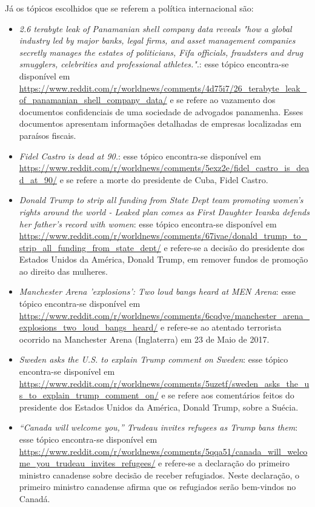 Já os tópicos escolhidos que se referem a política internacional são:
\begin{itemize}
  \item
  \textit{2.6 terabyte leak of Panamanian shell company data reveals "how a
  global industry led by major banks, legal firms, and asset management companies
  secretly manages the estates of politicians, Fifa officials, fraudsters and
  drug smugglers, celebrities and professional
  athletes."}.: esse tópico encontra-se disponível em
  \url{https://www.reddit.com/r/worldnews/comments/4d75i7/26_terabyte_leak_of_panamanian_shell_company_data/}
  e se refere ao vazamento dos documentos confidenciais de uma
  sociedade de advogados panamenha. Esses documentos apresentam informações
  detalhadas de empresas localizadas em paraísos fiscais.
  \item
  \textit{Fidel Castro is dead at
  90.}: esse tópico encontra-se disponível em
  \url{https://www.reddit.com/r/worldnews/comments/5exz2e/fidel_castro_is_dead_at_90/}
  e se refere a morte do presidente de Cuba, Fidel Castro.
  
  \item
  \textit{Donald Trump to strip all funding from State Dept team promoting
  women's rights around the world - Leaked plan comes as First Daughter Ivanka
  defends her father's record with women}: esse tópico encontra-se disponível em
  \url{https://www.reddit.com/r/worldnews/comments/67ivae/donald_trump_to_strip_all_funding_from_state_dept/}
  e refere-se a decisão do presidente dos Estados Unidos da América, Donald
  Trump, em remover fundos de promoção ao direito das mulheres.
  
  \item
  \textit{Manchester Arena 'explosions': Two loud bangs heard at MEN Arena}:
  esse tópico encontra-se disponível em
  \url{https://www.reddit.com/r/worldnews/comments/6cqdye/manchester_arena_explosions_two_loud_bangs_heard/}
  e refere-se ao atentado terrorista ocorrido na Manchester Arena (Inglaterra)
  em 23 de Maio de 2017.
  
  \item
  \textit{Sweden asks the U.S. to explain Trump comment on
  Sweden}: esse tópico encontra-se disponível em
  \url{https://www.reddit.com/r/worldnews/comments/5uzetf/sweden_asks_the_us_to_explain_trump_comment_on/}
  e se refere aos comentários feitos do presidente dos Estados Unidos da
  América, Donald Trump, sobre a Suécia.
  
  \item\textit{“Canada will welcome you,” Trudeau invites refugees as Trump bans
  them}: esse tópico encontra-se disponível em
  \url{https://www.reddit.com/r/worldnews/comments/5qqa51/canada_will_welcome_you_trudeau_invites_refugees/}
  e refere-se a declaração do primeiro ministro canadense sobre decisão de
  receber refugiados. Neste declaração, o primeiro ministro canadense afirma que
  os refugiados serão bem-vindos no Canadá.
\end{itemize}

